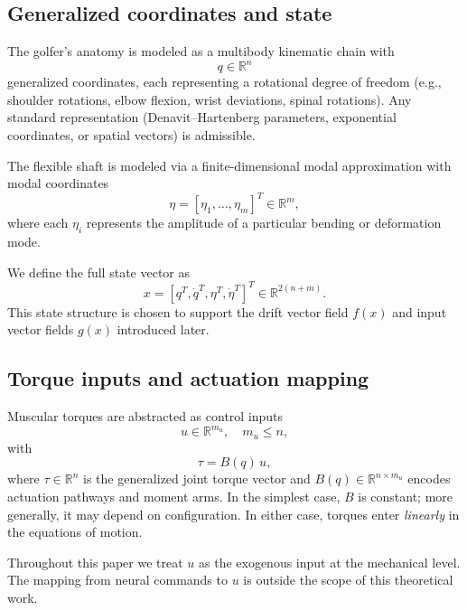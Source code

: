 \documentclass[12pt]{article}
\newcommand{\R}{\mathbb{R}}
\newcommand{\qd}{\dot{q}}
\newcommand{\etad}{\dot{\eta}}
\begin{document}
\subsection{Generalized coordinates and state}
\label{subsec:coords_state}

The golfer's anatomy is modeled as a multibody kinematic chain with
\begin{equation}
  q \in \R^{n}
\end{equation}
generalized coordinates, each representing a rotational degree of freedom (e.g., shoulder rotations, elbow flexion, wrist deviations, spinal rotations). Any standard representation (Denavit--Hartenberg parameters, exponential coordinates, or spatial vectors) is admissible.

The flexible shaft is modeled via a finite-dimensional modal approximation with modal coordinates
\begin{equation}
  \eta = [\eta_{1}, \dots, \eta_{m}]^{T} \in \R^{m},
\end{equation}
where each \( \eta_{i} \) represents the amplitude of a particular bending or deformation mode.

We define the full state vector as
\begin{equation}
  x = [q^{T}, \qd^{T}, \eta^{T}, \etad^{T}]^{T} \in \R^{2(n+m)}.
\end{equation}
This state structure is chosen to support the drift vector field \( f(x) \) and input vector fields \( g(x) \) introduced later.

\subsection{Torque inputs and actuation mapping}
\label{subsec:inputs}

Muscular torques are abstracted as control inputs
\begin{equation}
  u \in \R^{m_{u}}, \quad m_{u} \leq n,
\end{equation}
with
\begin{equation}
  \tau = B(q)\, u,
\end{equation}
where \( \tau \in \R^{n} \) is the generalized joint torque vector and \( B(q) \in \R^{n \times m_{u}} \) encodes actuation pathways and moment arms. In the simplest case, \(B\) is constant; more generally, it may depend on configuration. In either case, torques enter \emph{linearly} in the equations of motion.

Throughout this paper we treat \(u\) as the exogenous input at the mechanical level. The mapping from neural commands to \(u\) is outside the scope of this theoretical work.
\end{document}
